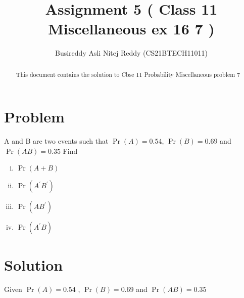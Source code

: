 \documentclass[journal,12pt,twocolumn]{IEEEtran}
\title{Assignment 5 ( Class 11 Miscellaneous ex 16 7 )}
\author{Busireddy Asli Nitej Reddy (CS21BTECH11011)}
\date{}
\providecommand{\pr}[1]{\ensuremath{\Pr\left(#1\right)}}
\begin{document}
\maketitle


\begin{abstract}
This document contains the solution to Cbse 11  Probability Miscellaneous problem 7	
\end{abstract}



\section*{\textbf{Problem}}

 A and B are two events such that  $\pr{A} = 0.54$, $\pr{B} = 0.69$ and $\pr{A B} = 0.35$ Find
     \begin{enumerate}[i)]
         \item $\pr{A+B}$
         \item $\pr{A^{\prime} B^{\prime}}$
         \item $\pr{A B^{\prime}}$
         \item $\pr{A^{\prime} B}$
     \end{enumerate}



\section*{\textbf{Solution}}

Given  $\pr{A} = 0.54$ , $\pr{B} = 0.69$ and $\pr{A B} = 0.35$
\end{document}
